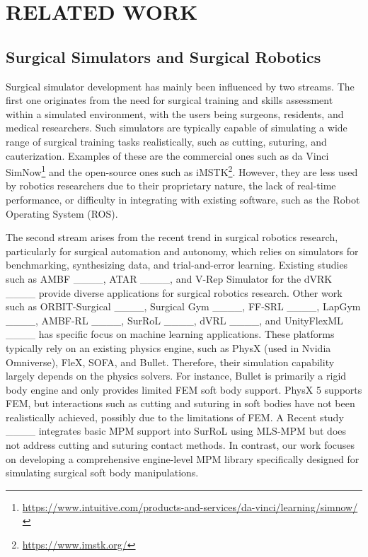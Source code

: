 \section{RELATED WORK}
\subsection{Surgical Simulators and Surgical Robotics}
Surgical simulator development has mainly been influenced by two streams. The first one originates from the need for surgical training and skills assessment within a simulated environment, with the users being surgeons, residents, and medical researchers.
Such simulators are typically capable of simulating a wide range of surgical training tasks realistically, such as cutting, suturing, and cauterization.
Examples of these are the commercial ones such as da Vinci SimNow\footnote{\url{https://www.intuitive.com/products-and-services/da-vinci/learning/simnow/}}
and the open-source ones such as iMSTK\footnote{\url{https://www.imstk.org/}}.
However, they are less used by robotics researchers due to their proprietary nature, the lack of real-time performance, or difficulty in integrating with existing software, such as the Robot Operating System (ROS).

The second stream arises from the recent trend in surgical robotics research, particularly for surgical automation and autonomy, which relies on simulators for benchmarking, synthesizing data, and trial-and-error learning.
Existing studies such as AMBF ____, ATAR ____, and V-Rep Simulator for the dVRK ____ provide diverse applications for surgical robotics research.
Other work such as ORBIT-Surgical ____, Surgical Gym ____, FF-SRL ____, LapGym ____, AMBF-RL ____, SurRoL ____, dVRL ____, and UnityFlexML ____ has specific focus on machine learning applications.
These platforms typically rely on an existing physics engine, such as PhysX (used in Nvidia Omniverse), FleX, SOFA, and Bullet.
Therefore, their simulation capability largely depends on the physics solvers. For instance, Bullet is primarily a rigid body engine and only provides limited FEM soft body support.
PhysX 5 supports FEM, but interactions such as cutting and suturing in soft bodies have not been realistically achieved, possibly due to the limitations of FEM.
A Recent study ____ integrates basic MPM support into SurRoL using MLS-MPM but does not address cutting and suturing contact methods.
In contrast, our work focuses on developing a comprehensive engine-level MPM library specifically designed for simulating surgical soft body manipulations.

